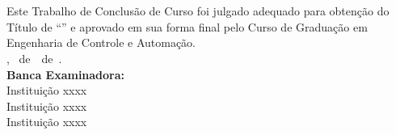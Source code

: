 \imprimircapa


\imprimirfolhaderosto*

\begin{fichacatalografica}
	
\end{fichacatalografica}

\begin{folhadeaprovacao}
	\OnehalfSpacing
	\centering
	\imprimirautor\\%
	\vspace{24pt}		
	\textbf{\imprimirtitulo}%
	\ifnotempty{\imprimirsubtitulo}{:~\imprimirsubtitulo}\\%
	\vspace*{\baselineskip}
	Este Trabalho de Conclusão de Curso foi julgado adequado para obtenção do Título de ``\imprimirformacao'' e aprovado em sua forma final pelo Curso de Graduação em Engenharia de Controle e Automação.\\
	\vspace{12pt}
	\imprimirlocal, \imprimirdia~de~\imprimirmes~de~\imprimirano.\\
	
	\vspace*{18pt}
	\textbf{Banca Examinadora:}\\
	
	\vspace*{24pt}
	\assinatura{\OnehalfSpacing \imprimirbancaa}
	\vspace{6pt}
	Instituição xxxx\\
	
	\vspace*{24pt}
	\assinatura{\OnehalfSpacing \imprimirbancab}
	\vspace{6pt}
	Instituição xxxx\\
	
	\vspace*{24pt}
	\assinatura{\OnehalfSpacing \imprimirbancac}
	\vspace{6pt}
	Instituição xxxx\\
	
\end{folhadeaprovacao}

\ifnotempty{\imprimirdedicatoriatcc}{
\begin{dedicatoria}
	\vspace*{\fill}
	\noindent
	\begin{adjustwidth*}{}{5.5cm} 
		\raggedleft       
		\imprimirdedicatoriatcc
	\end{adjustwidth*}
\end{dedicatoria}
}

